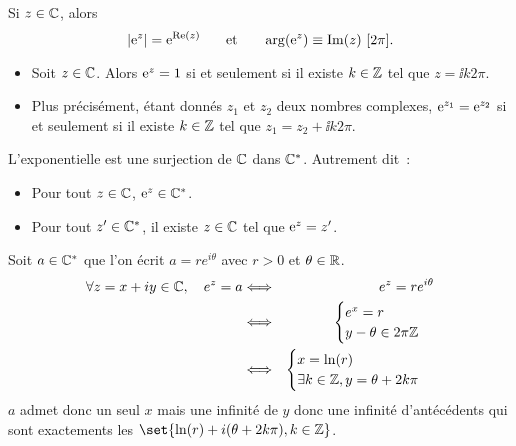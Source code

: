 \documentclass{magnolia}
\begin{document}
\begin{remarqueUnique}
\remarque Si $z\in\mathbb{C}$, alors
  \[\left|{\rm e}^z\right|={\rm e}^{\mathop{\rm Re}(z)} \quad\quad\!\text{et}\quad\!\quad \arg({\rm e}^z)\equiv \mathop{\rm Im}(z)\ [2\pi].\]
\end{remarqueUnique}

\begin{proposition}[utile=-3]
\begin{itemize}
\item Soit $z\in\mathbb{C}$. Alors ${\rm e}^z=1$ si et seulement si il existe
  $k\in\mathbb{Z}$ tel que $z=\ii k2\pi$.
\item  Plus précisément, étant donnés $z_1$ et $z_2$ deux nombres
  complexes, ${\rm e}^{z_1}={\rm e}^{z_2}$ si et seulement si il existe
  $k\in\mathbb{Z}$ tel que $z_1=z_2+\ii k2\pi$.
\end{itemize}
\end{proposition}

\begin{proposition}[utile=-3]
L'exponentielle est une surjection de $\mathbb{C}$ dans $\mathbb{C}^*$. Autrement dit~:
\begin{itemize}
\item Pour tout $z\in\mathbb{C}$, ${\rm e}^{z}\in\mathbb{C}^*$.
\item Pour tout $z'\in\mathbb{C}^*$, il existe $z\in\mathbb{C}$ tel que ${\rm e}^{z}=z'$.
\end{itemize}
\end{proposition}

\begin{preuve}
Soit $a\in \mathbb{C}^*$ que l'on écrit $a=re^{i\theta}$ avec $r>0$ et $\theta \in \mathbb{R}$.
\begin{eqnarray*}
\forall z=x+iy \in \mathbb{C}, \quad e^z=a & \Longleftrightarrow &e^z=re^{i\theta} \\
& \Longleftrightarrow & \begin{cases}
    e^x=r\\
    y-\theta \in 2\pi\mathbb{Z}
    \end{cases}\\
& \Longleftrightarrow & \begin{cases}
    x=\ln(r)\\
    \exists k \in \mathbb{Z}, y=\theta+2k\pi
    \end{cases}
\end{eqnarray*}
$a$ admet donc un seul $x$ mais une infinité de $y$ donc une infinité d'antécédents qui sont exactements les $\set{\ln(r)+i(\theta+2k\pi), k\in \Z}$.


\end{preuve}
\end{document}
